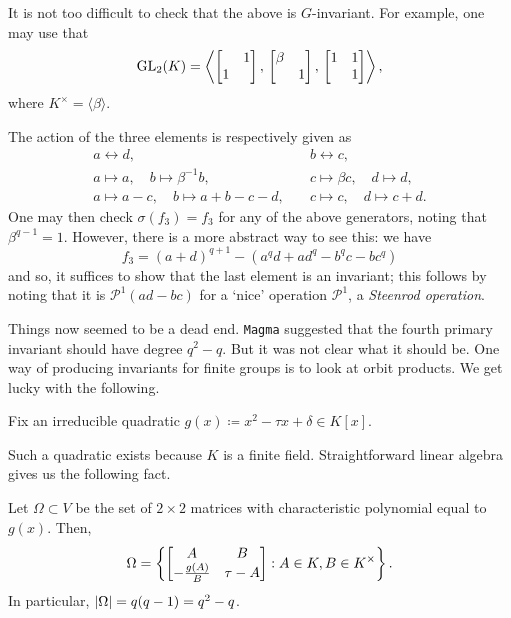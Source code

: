 \documentclass[12pt]{article}
\begin{document}
	It is not too difficult to check that the above is $G$-invariant. 
	For example, one may use that 
	\begin{equation} \label{eq:gens}
		\operatorname{GL}_{2}(K) = \left\langle \begin{bmatrix}  & 1 \\ 1 &  \end{bmatrix},\, \begin{bmatrix} \beta &  \\  & 1 \end{bmatrix},\, \begin{bmatrix} 1 & 1 \\  & 1 \end{bmatrix} \right\rangle,
	\end{equation}
	where $K^{\times} = \langle \beta \rangle$. 

	The action of the three elements is respectively given as
	\begin{align*} 
		a \leftrightarrow d, \quad & b \leftrightarrow c, \\
		a \mapsto a, \quad b \mapsto \beta^{-1} b, \quad & c \mapsto \beta c,\quad d \mapsto d, \\
		a \mapsto a - c, \quad b \mapsto a + b - c - d, \quad & c \mapsto c, \quad d \mapsto c + d.
	\end{align*}
	One may then check $\sigma(f_{3}) = f_{3}$ for any of the above generators, noting that $\beta^{q - 1} = 1$. 
	However, there is a more abstract way to see this: we have
	\begin{equation*} 
		f_{3} = (a + d)^{q + 1} - (a^{q} d + a d^{q} - b^{q} c - b c^{q})
	\end{equation*}
	and so, it suffices to show that the last element is an invariant;
	this follows by noting that it is $\mathcal{P}^{1}(ad - bc)$ for a `nice' operation $\mathcal{P}^{1}$, a \emph{Steenrod operation}.

	Things now seemed to be a dead end. 
	\texttt{Magma} suggested that the fourth primary invariant should have degree $q^{2} - q$. 
	But it was not clear what it should be. 
	One way of producing invariants for finite groups is to look at orbit products. 
	We get lucky with the following. 

	\begin{tcolorbox}
		Fix an irreducible quadratic $g(x) \coloneqq x^{2} - \tau x + \delta \in K[x]$. 
	\end{tcolorbox}

	Such a quadratic exists because $K$ is a finite field. Straightforward linear algebra gives us the following fact.

	\begin{thm}
		Let $\Omega \subset V$ be the set of $2 \times 2$ matrices with characteristic polynomial equal to $g(x)$. 
		Then,
		\begin{equation*} 
			\Omega = \left\{\begin{bmatrix} A & B \\ -\frac{g(A)}{B} & \tau - A \end{bmatrix} : A \in K , B \in K^{\times}\right\}.
		\end{equation*}
		In particular, ${\left\lvert \Omega \right\lvert} = q(q - 1) = q^{2} - q$.
	\end{thm}
\end{document}
